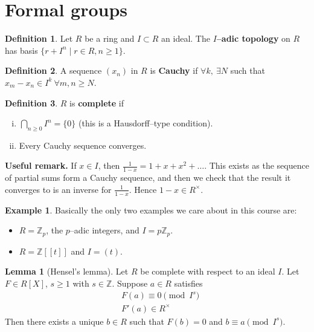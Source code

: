 \documentclass{article}
\theoremstyle{definition}
\newtheorem{lemma}[theorem]{Lemma}
\newtheorem{example}[theorem]{Example}
\newtheorem{defn}{Definition}[section]
\begin{document}
\section{Formal groups}
\begin{defn}
    Let $R$ be a ring and $I \subset R$ an ideal. The \textbf{$I$--adic topology} on $R$ has basis $\{r+I^n \mid r \in R, n\ge 1\}$.
\end{defn}
\begin{defn}
    A sequence $(x_n)$ in $R$ is \textbf{Cauchy} if $\forall k, ~ \exists N$ such that $x_m - x_n \in I^k ~\forall m,n \ge N$.
\end{defn}
\begin{defn}
    $R$ is \textbf{complete} if 
    \begin{enumerate}[(i)]
        \item $\bigcap_{n\ge 0} I^n = \{0\}$ (this is a Hausdorff--type condition).
        \item Every Cauchy sequence converges.
    \end{enumerate}
\end{defn}
\textbf{Useful remark.} If $x \in I$, then $\frac{1}{1-x}=1+x+x^2+\ldots$. This exists as the sequence of partial sums form a Cauchy sequence, and then we check that the result it converges to is an inverse for $\frac{1}{1-x}$. Hence $1-x \in R^{\times}$.
\begin{example}
    Basically the only two examples we care about in this course are:
    \begin{itemize}
        \item $R = \mathbb{Z}_p$, the $p$--adic integers, and $I = p \mathbb{Z}_p$.
        \item $R = \mathbb{Z}[[t]]$ and $I=(t)$.
    \end{itemize} 
\end{example} 
\begin{lemma}[Hensel's lemma]\label{lemma8.1}
    Let $R$ be complete with respect to an ideal $I$. Let $F \in R[X]$, $s\ge 1$ with $s \in \mathbb{Z}$. Suppose $a \in R$ satisfies 
    \begin{align*}
        &F(a) \equiv 0 \pmod{I^s}\\
        &F'(a) \in R^\times
    \end{align*}
    Then there exists a unique $b \in R$ such that $F(b)=0$ and $b \equiv a \pmod{I^s}$.
\end{lemma}
\end{document}
